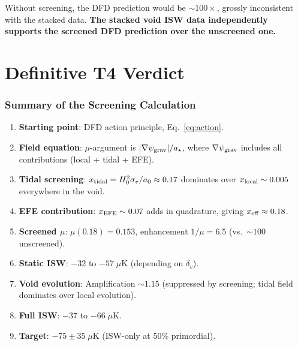 \documentclass[11pt,a4paper]{article}
\newcommand{\aM}{a_0}
\newcommand{\astar}{a_\star}
\newcommand{\mufd}{\mu}
\newcommand{\psigrav}{\psi_{\rm grav}}
\begin{document}
Without screening, the DFD prediction would be $\sim 100\times$,
grossly inconsistent with the stacked data. \textbf{The stacked
void ISW data independently supports the screened DFD prediction
over the unscreened one.}


\part{Definitive T4 Verdict}
\label{part:verdict}


\section{Summary of the Screening Calculation}
\label{sec:summary-calc}

\begin{enumerate}
\item \textbf{Starting point}: DFD action principle, Eq.~\eqref{eq:action}.
\item \textbf{Field equation}: $\mufd$-argument is $|\nabla\psigrav|/\astar$,
  where $\nabla\psigrav$ includes all contributions (local + tidal + EFE).
\item \textbf{Tidal screening}: $x_{\rm tidal} = H_0^2\sigma_v/\aM
  \approx 0.17$ dominates over $x_{\rm local} \sim 0.005$ everywhere
  in the void.
\item \textbf{EFE contribution}: $x_{\rm EFE} \sim 0.07$ adds in
  quadrature, giving $x_{\rm eff} \approx 0.18$.
\item \textbf{Screened $\mufd$}: $\mufd(0.18) = 0.153$, enhancement
  $1/\mufd = 6.5$ (vs.\ $\sim 100$ unscreened).
\item \textbf{Static ISW}: $-32$ to $-57\;\mu$K (depending on $\delta_v$).
\item \textbf{Void evolution}: Amplification $\sim 1.15$ (suppressed by
  screening; tidal field dominates over local evolution).
\item \textbf{Full ISW}: $-37$ to $-66\;\mu$K.
\item \textbf{Target}: $-75 \pm 35\;\mu$K (ISW-only at 50\% primordial).
\end{enumerate}
\end{document}
